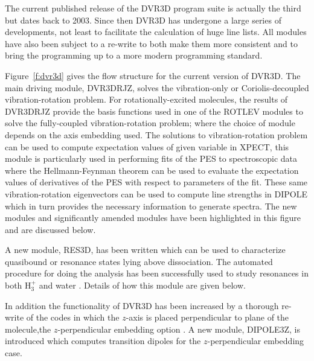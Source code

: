 \documentclass[12pt]{article}
\newcommand{\2}{$_{2}$}
\newcommand{\3}{$_{3}$}
\newcommand{\4}{$_{4}$}
\begin{document}
The current published release of the {\sc DVR3D} program suite
\cite{DVR3D} is actually the third but dates back to 2003. Since then
{\sc DVR3D} has undergone a large series of developments, not least to
facilitate the calculation of huge line lists.  All modules have also
been subject to a re-write to both make them more consistent and to
bring the programming up to a more modern programming standard.

Figure~\ref{f:dvr3d} gives the flow structure for the current version
of {\sc DVR3D}. The main driving module, {\sc DVR3DRJZ}, solves the
vibration-only or Coriolis-decoupled vibration-rotation problem.  For
rotationally-excited molecules, the results of {\sc DVR3DRJZ} provide
the basis functions used in one of the {\sc ROTLEV} modules to solve
the fully-coupled vibration-rotation problem; where the choice of
module depends on the axis embedding used. The solutions to
vibration-rotation problem can be used to compute expectation values
of given variable in {\sc XPECT}, this module is particularly used in
performing fits of the PES to spectroscopic data where the
Hellmann-Feynman theorem can be used to evaluate the expectation
values of derivatives of the PES with respect to parameters of the
fit. These same vibration-rotation eigenvectors can be used to compute
line strengths in {\sc DIPOLE} which in turn provides the necessary
information to generate spectra. The new modules and significantly
amended modules have been highlighted in this figure and are
discussed below.

A new module, {\sc RES3D}, has been written \cite{jt443} which can be
used to characterize quasibound or resonance states lying above
dissociation.  The automated procedure for doing the analysis has been
successfully used to study resonances in both H$_3^+$ \cite{jt443} and
water \cite{jt500}. Details of how this module are given below.

In addition the
functionality of {\sc DVR3D} has been increased by a thorough re-write of
the codes in which the $z$-axis is placed perpendicular to plane of the
molecule,the $z$-perpendicular embedding option
\cite{jt290,jt310}.  A new module, {\sc DIPOLE3Z},
is introduced which computes transition dipoles for the
$z$-perpendicular embedding case.
\end{document}
